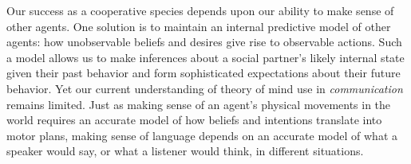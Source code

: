 \documentclass[manuscript]{stjour}
\begin{document}
Our success as a cooperative species depends upon our ability to make sense of other agents. 
One solution is to maintain an internal predictive model of other agents: how unobservable beliefs and desires give rise to observable actions. 
Such a model allows us to make inferences about a social partner's likely internal state given their past behavior and form sophisticated expectations about their future behavior. 
Yet our current understanding of theory of mind use in \emph{communication} remains limited. 
Just as making sense of an agent's physical movements in the world requires an accurate model of how beliefs and intentions translate into motor plans, making sense of language depends on an accurate model of what a speaker would say, or what a listener would think, in different situations. 
\end{document}
